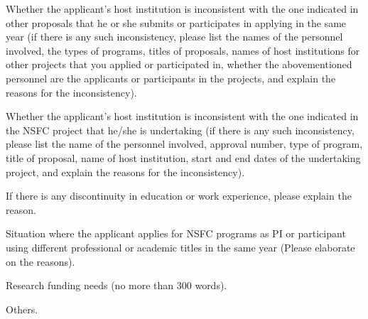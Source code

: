 \documentclass[14pt,UTF8,AutoFakeBold=3,a4paper]{ctexart}
\newcommand{\blue}[1]{{\color{NsfcBlue}#1}}
\begin{document}

\blue{Whether the applicant's host institution is inconsistent with the one indicated in other proposals that he or she submits or participates in applying in the same year (if there is any such inconsistency, please list the names of the personnel involved, the types of programs, titles of proposals, names of host institutions for other projects that you applied or participated in, whether the abovementioned personnel are the applicants or participants in the projects, and explain the reasons for the inconsistency).}


\blue{Whether the applicant's host institution is inconsistent with the one indicated in the NSFC project that he/she is undertaking (if there is any such inconsistency, please list the name of the personnel involved, approval number, type of program, title of proposal, name of host institution, start and end dates of the undertaking project, and explain the reasons for the inconsistency).}


\blue{If there is any discontinuity in education or work experience, please explain the reason.}


\blue{Situation where the applicant applies for NSFC programs as PI or participant using different professional or academic titles in the same year (Please elaborate on the reasons).}


\blue{Research funding needs (no more than 300 words).}

 \blue{Others.}
\end{document}
